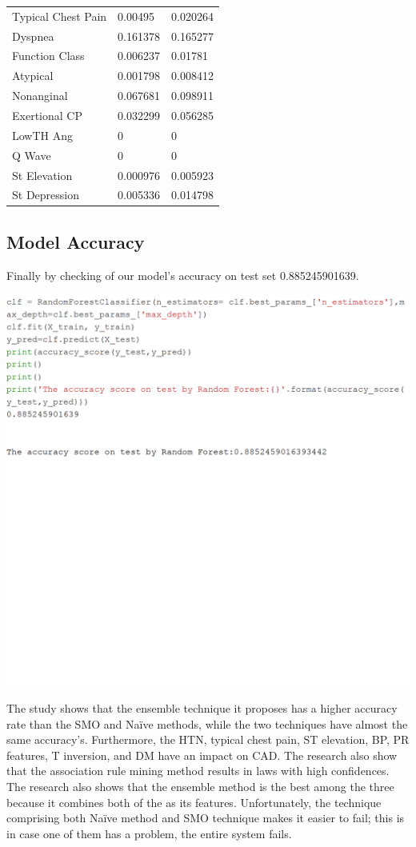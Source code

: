 \documentclass[sigconf]{acmart}
\begin{document}
\begin{table}[]
\begin{tabular}{lll}
Typical Chest Pain    & 0.00495  & 0.020264 \\
Dyspnea               & 0.161378 & 0.165277 \\
Function Class        & 0.006237 & 0.01781  \\
Atypical              & 0.001798 & 0.008412 \\
Nonanginal            & 0.067681 & 0.098911 \\
Exertional CP         & 0.032299 & 0.056285 \\
LowTH Ang             & 0        & 0        \\
Q Wave                & 0        & 0        \\
St Elevation          & 0.000976 & 0.005923 \\
St Depression         & 0.005336 & 0.014798
\end{tabular}
\end{table}

\subsection{Model Accuracy}  

Finally by checking of our model's accuracy on test set 0.885245901639.

\includegraphics[width=0.95\columnwidth]{images/Untitled7.png}

The study shows that the ensemble technique it proposes has a higher accuracy rate than the SMO and Naïve methods, while the two techniques have almost the same accuracy's. Furthermore, the HTN, typical chest pain, ST elevation, BP, PR features, T inversion, and DM have an impact on CAD. The research also show that the association rule mining method results in laws with high confidences. The research also shows that the ensemble method is the best among the three because it combines both of the as its features. Unfortunately, the technique comprising both Naïve method and SMO technique makes it easier to fail; this is in case one of them has a problem, the entire system fails.
\end{document}
